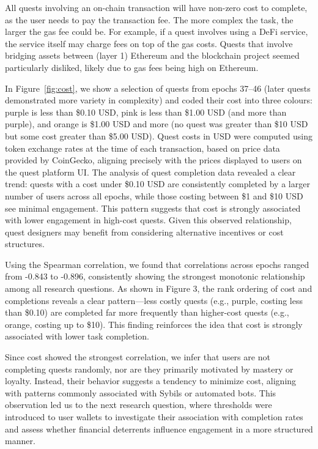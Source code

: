 All quests involving an on-chain transaction will have non-zero cost to complete, as the user needs to pay the transaction fee. The more complex the task, the larger the gas fee could be. For example, if a quest involves using a DeFi service, the service itself may charge fees on top of the gas costs. Quests that involve bridging assets between (layer 1) Ethereum and the blockchain project seemed particularly disliked, likely due to gas fees being high on Ethereum. 

In Figure~\ref{fig:cost}, we show a selection of quests from epochs 37--46 (later quests demonstrated more variety in complexity) and coded their cost into three colours: purple is less than \$0.10 USD, pink is less than \$1.00 USD (and more than purple), and orange is \$1.00 USD and more (no quest was greater than \$10 USD but some cost greater than \$5.00 USD). Quest costs in USD were computed using token exchange rates at the time of each transaction, based on price data provided by CoinGecko, aligning precisely with the prices displayed to users on the quest platform UI. The analysis of quest completion data revealed a clear trend: quests with a cost under \$0.10 USD are consistently completed by a larger number of users across all epochs, while those costing between \$1 and \$10 USD see minimal engagement. This pattern suggests that cost is strongly associated with lower engagement in high-cost quests. Given this observed relationship, quest designers may benefit from considering alternative incentives or cost structures.

Using the Spearman correlation, we found that correlations across epochs ranged from -0.843 to -0.896, consistently showing the strongest monotonic relationship among all research questions.
As shown in Figure 3, the rank ordering of cost and completions reveals a clear pattern—less costly quests (e.g., purple, costing less than \$0.10) are completed far more frequently than higher-cost quests (e.g., orange, costing up to \$10). This finding reinforces the idea that cost is strongly associated with lower task completion.

Since cost showed the strongest correlation, we infer that users are not completing quests randomly, nor are they primarily motivated by mastery or loyalty. Instead, their behavior suggests a tendency to minimize cost, aligning with patterns commonly associated with Sybils or automated bots. This observation led us to the next research question, where thresholds were introduced to user wallets to investigate their association with completion rates and assess whether financial deterrents influence engagement in a more structured manner. 


